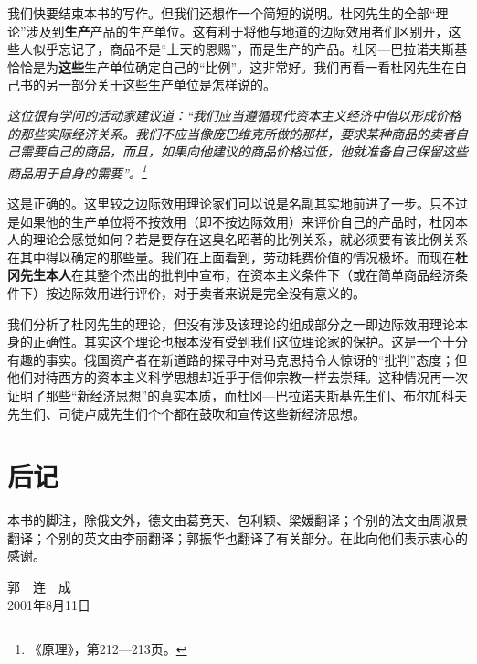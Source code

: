 \documentclass[fontset=fandol, a4paper, 12pt, openright]{ctexbook}
\renewenvironment{quote}
  {\list{}{\rightmargin\leftmargin}%
   \item\relax\small\itshape\color{darkgray}}
  {\endlist}
\begin{document}
我们快要结束本书的写作。但我们还想作一个简短的说明。杜冈先生的全部“理论”涉及到\textbf{生产}产品的生产单位。这有利于将他与地道的边际效用者们区别开，这些人似乎忘记了，商品不是“上天的恩赐”，而是生产的产品。杜冈—巴拉诺夫斯基恰恰是为\textbf{这些}生产单位确定自己的“比例”。这非常好。我们再看一看杜冈先生在自己书的另一部分关于这些生产单位是怎样说的。

\begin{quote}
这位很有学问的活动家建议道：“我们应当遵循现代资本主义经济中借以形成价格的那些实际经济关系。我们不应当像庞巴维克所做的那样，要求某种商品的卖者自己需要自己的商品，而且，如果向他建议的商品价格过低，他就准备自己保留这些商品用于自身的需要”。\footnote{《原理》，第212—213页。}
\end{quote}

这是正确的。这里较之边际效用理论家们可以说是名副其实地前进了一步。只不过是如果他的生产单位将不按效用（即不按边际效用）来评价自己的产品时，杜冈本人的理论会感觉如何？若是要存在这臭名昭著的比例关系，就必须要有该比例关系在其中得以确定的那些量。我们在上面看到，劳动耗费价值的情况极坏。而现在\textbf{杜冈先生本人}在其整个杰出的批判中宣布，在资本主义条件下（或在简单商品经济条件下）按边际效用进行评价，对于卖者来说是完全没有意义的。

我们分析了杜冈先生的理论，但没有涉及该理论的组成部分之一即边际效用理论本身的正确性。其实这个理论也根本没有受到我们这位理论家的保护。这是一个十分有趣的事实。俄国资产者在新道路的探寻中对马克思持令人惊讶的“批判”态度；但他们对待西方的资本主义科学思想却近乎于信仰宗教一样去崇拜。这种情况再一次证明了那些“新经济思想”的真实本质，而杜冈—巴拉诺夫斯基先生们、布尔加科夫先生们、司徒卢威先生们个个都在鼓吹和宣传这些新经济思想。


\backmatter %

\chapter*{后记}

本书的脚注，除俄文外，德文由葛竞天、包利颖、梁媛翻译；个别的法文由周淑景翻译；个别的英文由李丽翻译；郭振华也翻译了有关部分。在此向他们表示衷心的感谢。

\bigskip
\bigskip

\begin{flushright}
    郭　连　成 \\
    2001年8月11日
\end{flushright}
\end{document}
